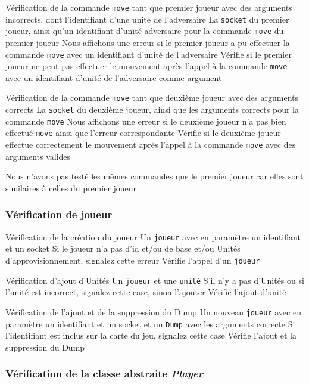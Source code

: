 \mytest
{Vérification de la commande {\tt move} tant que premier joueur avec des arguments incorrects, dont l'identifiant d'une unité de l'adversaire}
{La {\tt socket} du premier joueur, ainsi qu'un identifiant d'unité adversaire pour la commande {\tt move} du premier joueur}
{Nous affichons une erreur si le premier joueur a pu effectuer la commande {\tt move} avec un identifiant d'unité de l'adversaire}
{Vérifie si le premier joueur ne peut pas effectuer le mouvement après l'appel à la commande {\tt move} avec un identifiant d'unité de l'adversaire comme argument}

\mytest
{Vérification de la commande {\tt move} tant que deuxième joueur avec des arguments corrects}
{La {\tt socket} du deuxième joueur, ainsi que les arguments corrects pour la commande {\tt move}}
{Nous affichons une erreur si le deuxième joueur n'a pas bien effectué {\tt move} ainsi que l'erreur correspondante}
{Vérifie si le deuxième joueur effectue correctement le mouvement après l'appel à la commande {\tt move} avec des arguments valides}

Nous n'avons pas testé les mêmes commandes que le premier joueur car elles sont similaires à celles du premier joueur



\subsubsection{Vérification de joueur}

\mytest
{Vérification de la création du joueur }
{Un  {\tt joueur} avec en paramètre un identifiant et un socket}
{Si le joueur n'a pas d'id et/ou de base et/ou Unités d'approvisionnement, signalez cette erreur}
{Vérifie l'appel d'un {\tt joueur}}


\mytest
{Vérification d'ajout d'Unités }
{Un {\tt joueur} et une {\tt unité}}
{S'il n'y a pas d'Unités ou si l'unité est incorrect, signalez cette case, sinon l'ajouter}
{Vérifie l'ajout d'unité}


\mytest
{Vérification de l'ajout et de la suppression du Dump }
{Un nouveau {\tt joueur} avec en paramètre un identifiant et un socket et un {\tt Dump} avec les arguments correcte}
{Si l'identifiant est inclus sur la carte du jeu, signalez cette case}
{Vérifie l'ajout et la suppression du Dump}


\subsubsection{Vérification de la classe abstraite \emph{Player}}

